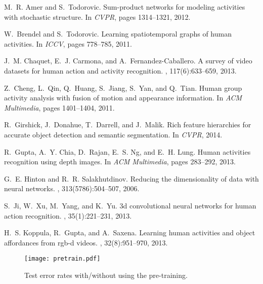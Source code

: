 \documentclass{sig-alternate}
\begin{document}
\begin{thebibliography}{40}
\vspace{3pt}
M.~R. Amer and S.~Todorovic.
\newblock Sum-product networks for modeling activities with stochastic
  structure.
\newblock In {\em CVPR}, pages 1314--1321, 2012.

W.~Brendel and S.~Todorovic.
\newblock Learning spatiotemporal graphs of human activities.
\newblock In {\em ICCV}, pages 778--785, 2011.

J.~M. Chaquet, E.~J. Carmona, and A.~Fernandez-Caballero.
\newblock A survey of video datasets for human action and activity recognition.
, 117(6):633--659, 2013.

Z.~Cheng, L.~Qin, Q.~Huang, S.~Jiang, S.~Yan, and Q.~Tian.
\newblock Human group activity analysis with fusion of motion and appearance
  information.
\newblock In {\em ACM Multimedia}, pages 1401--1404, 2011.

R.~Girshick, J.~Donahue, T.~Darrell, and J.~Malik.
\newblock Rich feature hierarchies for accurate object detection and semantic
  segmentation.
\newblock In {\em CVPR}, 2014.

R.~Gupta, A.~Y. Chia, D.~Rajan, E.~S. Ng, and E.~H. Lung.
\newblock Human activities recognition using depth images.
\newblock In {\em ACM Multimedia}, pages 283--292, 2013.

G.~E. Hinton and R.~R. Salakhutdinov.
\newblock Reducing the dimensionality of data with neural networks.
, 313(5786):504--507, 2006.

S.~Ji, W.~Xu, M.~Yang, and K.~Yu.
\newblock 3d convolutional neural networks for human action recognition.
, 35(1):221--231, 2013.

H.~S. Koppula, R.~Gupta, and A.~Saxena.
\newblock Learning human activities and object affordances from rgb-d videos.
,
  32(8):951--970, 2013.

\begin{figure}[!htb]
\centering
\texttt{[image: pretrain.pdf]}
\caption{Test error rates with/without using the pre-training.}\label{fig:pretrain}
\end{figure}


\end{thebibliography}
\end{document}
